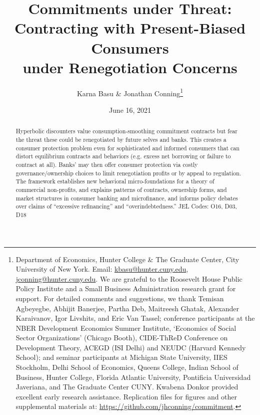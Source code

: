 \documentclass[11pt,english]{article}
\date{June 16, 2021}\usepackage{babel}
\theoremstyle{plain}
\theoremstyle{definition}
\begin{document}
\shorthandoff{=}

\title{Commitments under Threat: \\ Contracting with Present-Biased Consumers \\ under Renegotiation Concerns
}

\author{Karna Basu \& Jonathan Conning\thanks{Department of Economics, Hunter College \& The Graduate Center, City
University of New York. Email: \href{mailto:kbasu@hunter.cuny.edu}{kbasu@hunter.cuny.edu}, \href{mailto:jconning@hunter.cuny.edu}{jconning@hunter.cuny.edu}.
We are grateful to the Roosevelt House Public Policy Institute and
a Small Business Administration research grant for support. For detailed
comments and suggestions, we thank Temisan Agbeyegbe, Abhijit Banerjee,
Partha Deb, Maitreesh Ghatak, Alexander Karaivanov, Igor Livshits,
and Eric Van Tassel; conference participants at the NBER Development
Economics Summer Institute, `Economics of Social Sector Organizations'
(Chicago Booth), CIDE-ThReD Conference on Development Theory, ACEGD
(ISI Delhi) and NEUDC (Harvard Kennedy School); and seminar participants
at Michigan State University, IIES Stockholm, Delhi School of Economics,
Queens College, Indian School of Business, Hunter College, Florida
Atlantic University, Pontificia Universidad Javeriana, and The Graduate
Center CUNY. Kwabena Donkor provided excellent early research assistance.
Replication files for figures and other supplemental materials at:
\protect\url{https://github.com/jhconning/commitment}.}}


\begin{abstract}
Hyperbolic discounters value consumption-smoothing commitment contracts
but fear the threat these could be renegotiated by future selves and banks. This creates a consumer protection problem even for sophisticated and informed
consumers that can distort equilibrium contracts and behaviors (e.g.
excess net borrowing or failure to contract at all). Banks' may then offer
consumer protection via costly governance/ownership
choices to limit renegotiation profits or by appeal to regulation. The framework establishes
new behavioral micro-foundations for a theory of commercial non-profits, and explains
 patterns of contracts,  ownership forms, and market structures in consumer
banking and microfinance, and informs policy debates over claims of ``{}excessive
refinancing'' and ``overindebtedness.''{}  JEL Codes: O16, D03,
D18 
\end{abstract}

\maketitle
\end{document}
